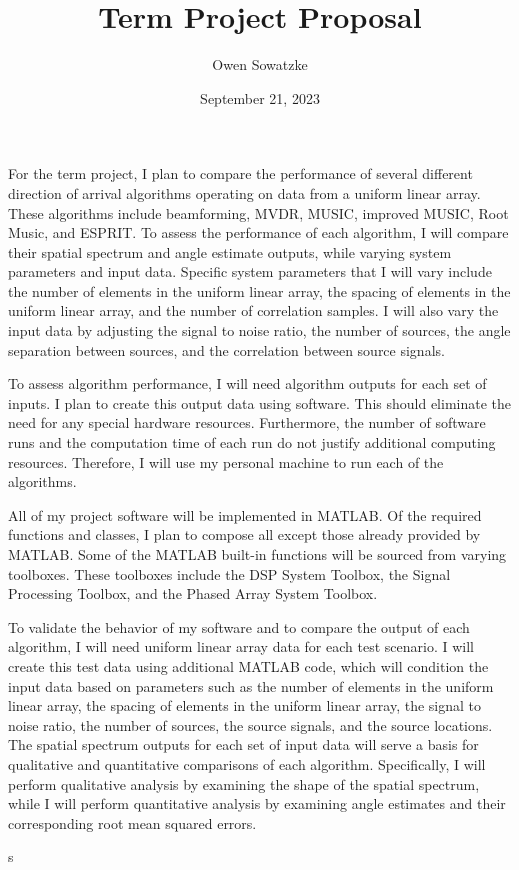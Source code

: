 \documentclass{article}
\title{Term Project Proposal}
\author{Owen Sowatzke}
\date{September 21, 2023}
\begin{document}
	\maketitle

	For the term project, I plan to compare the performance of several different direction of arrival algorithms operating on data from a uniform linear array. These algorithms include beamforming, MVDR, MUSIC, improved MUSIC, Root Music, and ESPRIT. To assess the performance of each algorithm, I will compare their spatial spectrum and angle estimate outputs, while varying system parameters and input data. Specific system parameters that I will vary include the number of elements in the uniform linear array, the spacing of elements in the uniform linear array, and the number of correlation samples. I will also vary the input data by adjusting the signal to noise ratio, the number of sources, the angle separation between sources, and the correlation between source signals.
	
	To assess algorithm performance, I will need algorithm outputs for each set of inputs. I plan to create this output data using software. This should eliminate the need for any special hardware resources. Furthermore, the number of software runs and the computation time of each run do not justify additional computing resources. Therefore, I will use my personal machine to run each of the algorithms.
	
	All of my project software will be implemented in MATLAB. Of the required functions and classes, I plan to compose all except those already provided by MATLAB. Some of the MATLAB built-in functions will be sourced from varying toolboxes. These toolboxes include the DSP System Toolbox, the Signal Processing Toolbox, and the Phased Array System Toolbox.
	
	To validate the behavior of my software and to compare the output of each algorithm, I will need uniform linear array data for each test scenario. I will create this test data using additional MATLAB code, which will condition the input data based on parameters such as the number of elements in the uniform linear array, the spacing of elements in the uniform linear array, the signal to noise ratio, the number of sources, the source signals, and the source locations. The spatial spectrum outputs for each set of input data will serve a basis for qualitative and quantitative comparisons of each algorithm. Specifically, I will perform qualitative analysis by examining the shape of the spatial spectrum, while I will perform quantitative analysis by examining angle estimates and their corresponding root mean squared errors.
	
	\nocite{doa_algorithms_raghu}
	\nocite{mvdr_montlouis}
	\nocite{capon_sanudin}
	\nocite{music_chowdhury}
	\nocite{improved_music_gupta}
	\nocite{root_music_esprit_patwari}
	\nocite{esprit_ning}
	\newpage
	{}
	s
\end{document}

